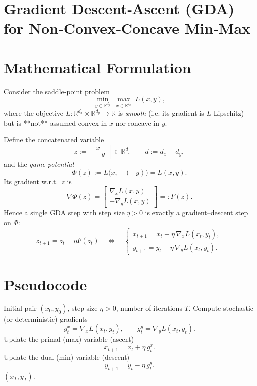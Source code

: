 \documentclass{article}
\newcommand{\R}{\mathbb{R}}
\begin{document}
\section*{Gradient Descent‑Ascent (GDA) for Non‑Convex‑Concave Min‑Max}

\section*{Mathematical Formulation}
Consider the saddle‑point problem  
\[
\min_{y\in\R^{d_y}}\;\max_{x\in\R^{d_x}} \;L(x,y),
\]
where the objective $L:\R^{d_x}\times\R^{d_y}\rightarrow\R$ is \emph{smooth} (i.e. its gradient is $L$‑Lipschitz) but is **not** assumed convex in $x$ nor concave in $y$.

Define the concatenated variable  
\[
z:=\begin{bmatrix}x\\-y\end{bmatrix}\in\R^{d},\qquad d:=d_x+d_y,
\]
and the \emph{game potential}
\[
\Phi(z):=L\bigl(x,-\,\!(-y)\bigr)=L(x,y).
\]
Its gradient w.r.t.\ $z$ is
\[
\nabla\Phi(z)=\begin{bmatrix}
\nabla_x L(x,y)\\[2mm]
-\nabla_y L(x,y)
\end{bmatrix}
=:F(z).
\]
Hence a single GDA step with step size $\eta>0$ is exactly a gradient–descent step on $\Phi$:
\[
z_{t+1}=z_t-\eta F(z_t)
\quad\Longleftrightarrow\quad
\begin{cases}
x_{t+1}=x_t+\eta \,\nabla_x L(x_t,y_t),\\[1mm]
y_{t+1}=y_t-\eta \,\nabla_y L(x_t,y_t).
\end{cases}
\tag{1}
\]

\section*{Pseudocode}
\begin{algorithm}[H]
\caption{Gradient Descent‑Ascent (GDA)}
\begin{algorithmic}[1]
\REQUIRE Initial pair $(x_0,y_0)$, step size $\eta>0$, number of iterations $T$.
    \STATE Compute stochastic (or deterministic) gradients  
    \[
    g^x_t=\nabla_x L(x_t,y_t),\qquad
    g^y_t=\nabla_y L(x_t,y_t).
    \]
    \STATE Update the primal (max) variable (ascent)  
    \[
    x_{t+1}=x_t+\eta\, g^x_t .
    \]
    \STATE Update the dual (min) variable (descent)  
    \[
    y_{t+1}=y_t-\eta\, g^y_t .
    \]
\ENDFOR
\RETURN $(x_T,y_T)$.
\end{algorithmic}
\end{algorithm}
\end{document}
